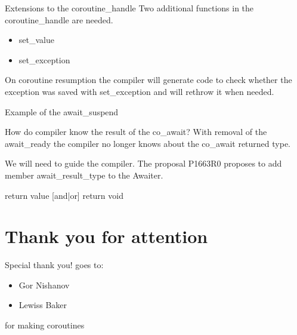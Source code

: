 \documentclass[10pt]{beamer}
\begin{document}
\begin{frame}{Extensions to the coroutine\_handle}
	Two additional functions in the coroutine\_handle are needed.

	\begin{itemize}[<+-| alert@+>]
		\item set\_value
		\item set\_exception
	\end{itemize}

	On coroutine resumption the compiler will generate code to check whether the exception was saved with \alert{set\_exception} and will rethrow it when needed.


\end{frame}

\begin{frame}{Example of the await\_suspend}

\end{frame}

\begin{frame}{How do compiler know the result of the co\_await?}
	With removal of the \alert{await\_ready} the compiler no longer knows about the co\_await returned type.
	\vfill

	We will need to guide the compiler. The proposal 
	P1663R0 proposes to add member \alert{await\_result\_type} to the Awaiter.
	\vfill

\end{frame}

\begin{frame}{return value [and|or] return void}

\end{frame}

\section*{Thank you for attention}

\begin{frame}{Special thank you! goes to:}
	\begin{itemize}
		\item Gor Nishanov
		\item Lewiss Baker	
	\end{itemize}

	for making coroutines 
\end{frame}
\end{document}
